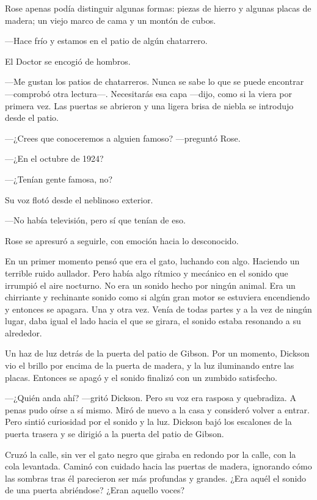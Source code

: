 {Rose apenas podía distinguir algunas formas: piezas de hierro y algunas
placas de madera; un viejo marco de cama y un montón de cubos.}

{---Hace frío y estamos en el patio de algún chatarrero.}

{El Doctor se encogió de hombros.}

{---Me gustan los patios de chatarreros. Nunca se sabe lo que se puede
	encontrar ---comprobó otra lectura---. Necesitarás esa capa
	---dijo, como si la viera por primera vez. Las puertas se abrieron y
una ligera brisa de niebla se introdujo desde el patio.}

{---¿Crees que conoceremos a alguien famoso? ---preguntó Rose.}

{---¿En el octubre de 1924?}

{---¿Tenían gente famosa, no?}

{Su voz flotó desde el neblinoso exterior.}

{---No había televisión, pero sí que tenían de eso.}

{Rose se apresuró a seguirle, con emoción hacia lo desconocido.}

{En un primer momento pensó que era el gato, luchando con algo. Haciendo
	un terrible ruido aullador. Pero había algo rítmico y mecánico en el
	sonido que irrumpió el aire nocturno. No era un sonido hecho por ningún
	animal. Era un chirriante y rechinante sonido como si algún gran motor
	se estuviera encendiendo y entonces se apagara. Una y otra vez. Venía de
	todas partes y a la vez de ningún lugar, daba igual el lado hacia el que
se girara, el sonido estaba resonando a su alrededor.}

{Un haz de luz detrás de la puerta del patio de Gibson. Por un momento,
	Dickson vio el brillo por encima de la puerta de madera, y la luz
	iluminando entre las placas. Entonces se apagó y el sonido finalizó con
un zumbido satisfecho.}

{---¿Quién anda ahí? ---gritó Dickson. Pero su voz era rasposa y
	quebradiza. A penas pudo oírse a sí mismo. Miró de nuevo a la casa y
	consideró volver a entrar. Pero sintió curiosidad por el sonido y la
	luz. Dickson bajó los escalones de la puerta trasera y se dirigió a la
puerta del patio de Gibson.}

{Cruzó la calle, sin ver el gato negro que giraba en redondo por la
	calle, con la cola levantada. Caminó con cuidado hacia las puertas de
	madera, ignorando cómo las sombras tras él parecieron ser más profundas
	y grandes. ¿Era aquél el sonido de una puerta abriéndose? ¿Eran aquello
voces?}

